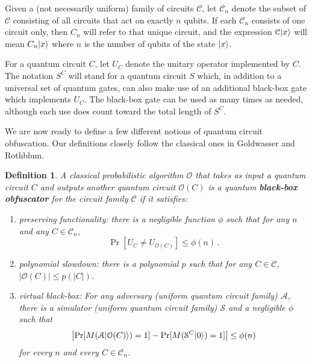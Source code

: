 \documentclass[11pt]{article}
\numberwithin{equation}{section}
\newtheorem{definition}{Definition}
\begin{document}
{Given a (not necessarily uniform) family of circuits $\mathcal C$, let $\mathcal C_n$ denote the subset of $\mathcal C$ consisting of all circuits that act on exactly $n$ qubits. If each $\mathcal C_n$ consists of one circuit only, then $C_n$ will refer to that unique circuit, and the expression $\mathcal C {\left\vert{x}\right\rangle}$ will mean $C_n {\left\vert{x}\right\rangle}$ where $n$ is the number of qubits of the state ${\left\vert{x}\right\rangle}$.

For a quantum circuit $C$, let $U_C$ denote the unitary operator implemented by $C$. The notation $S^C$ will stand for a quantum circuit $S$ which, in addition to a universal set of quantum gates, can also make use of an additional black-box gate which implements $U_C$. The black-box gate can be used as many times as needed, although each use does count toward the total length of $S^C$.

We are now ready to define a few different notions of quantum circuit obfuscation. Our definitions closely follow the classical ones in Goldwasser and Rothblum. 

\begin{definition}\label{def:black-box} A classical probabilistic algorithm $\mathcal O$ that takes as input a quantum circuit $C$ and outputs another quantum circuit $\mathcal O(C)$ is a quantum {\bf black-box obfuscator} for the circuit family $\mathcal C$ if it satisfies:
\begin{enumerate}
\item preserving functionality: there is a negligible function $\phi$ such that for any $n$ and any $C \in \mathcal C_n$, 
$$
\Pr[U_C \neq U_{\mathcal O(C)}] \leq \phi(n)\,.
$$
\item polynomial slowdown: there is a polynomial $p$ such that for any $C \in \mathcal C$, $|\mathcal O(C)| \leq p(|C|)$.
\item virtual black-box: For any adversary (uniform quantum circuit family) $\mathcal A$, there is a simulator (uniform quantum circuit family) $\mathcal S$ and a negligible $\phi$ such that
$$
\left| \Pr [M(\mathcal A{\left\vert{\mathcal O(C)}\right\rangle}) = 1] - \Pr[M(\mathcal S^C {\left\vert{0}\right\rangle}) = 1] \right| \leq \phi(n)
$$
for every $n$ and every $C \in \mathcal C_n$.
\end{enumerate}
\end{definition}

}
\end{document}
